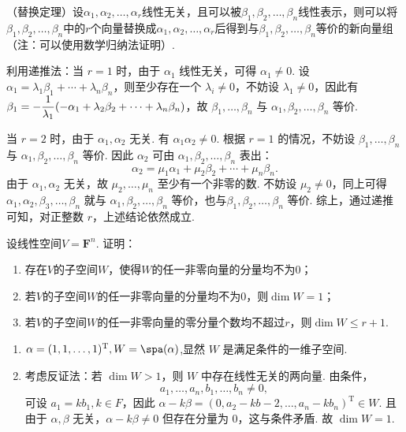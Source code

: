 \begin{exercise}
\begin{exgroup}
        \item （替换定理）设$\alpha_1,\alpha_2,\ldots,\alpha_r$线性无关，且可以被$\beta_1,\beta_2,\ldots,\beta_n$线性表示，则可以将$\beta_1,\beta_2,\ldots,\beta_n$中的$r$个向量替换成$\alpha_1,\alpha_2,\ldots,\alpha_r$后得到与$\beta_1,\beta_2,\ldots,\beta_n$等价的新向量组（注：可以使用数学归纳法证明）.
        \begin{answer}
            利用递推法：当 $r=1$ 时，由于 $\alpha_1$ 线性无关，可得 $\alpha_1\neq 0$. 设 $\alpha_1=\lambda_1\beta_1+\cdots+\lambda_n\beta_n$，则至少存在一个 $\lambda_i\neq 0$，不妨设 $\lambda_1\neq 0$，因此有 $\beta_1=-\vspace{1ex}\dfrac 1{\lambda_1}(-\alpha_1+\lambda_2\beta_2+\cdots+\lambda_n\beta_n)$，故 $\beta_1,\ldots,\beta_n$ 与 $\alpha_1,\beta_2,\ldots,\beta_n$ 等价.

            当 $r=2$ 时，由于 $\alpha_1,\alpha_2$ 无关. 有 $\alpha_1\alpha_2\neq 0$. 根据 $r=1$ 的情况，不妨设 $\beta_1,\ldots,\beta_n$ 与 $\alpha_1,\beta_2,\ldots,\beta_n$ 等价. 因此 $\alpha_2$ 可由 $\alpha_1,\beta_2,\ldots,\beta_n$ 表出：
            \[\alpha_2=\mu_1\alpha_1+\mu_2\beta_2+\cdots+\mu_n\beta_n.\]
            由于 $\alpha_1,\alpha_2$ 无关，故 $\mu_2,\ldots,\mu_n$ 至少有一个非零的数. 不妨设 $\mu_2\neq 0$，同上可得$\alpha_1,\alpha_2,\beta_3,\ldots,\beta_n$ 就与 $\alpha_1,\beta_2,\ldots,\beta_n$ 等价，也与$\beta_1,\beta_2,\ldots,\beta_n$ 等价. 综上，通过递推可知，对正整数 $r$，上述结论依然成立.
        \end{answer}

        \item 设线性空间$V=\mathbf{F}^n$. 证明：
        \begin{enumerate}
            \item 存在$V$的子空间$W$，使得$W$的任一非零向量的分量均不为0；

            \item 若$V$的子空间$W$的任一非零向量的分量均不为0，则$\dim W=1$；

            \item 若$V$的子空间$W$的任一非零向量的零分量个数均不超过$r$，则$\dim W \leqslant r+1$.
        \end{enumerate}
        \begin{answer}
            \begin{enumerate}
                \item $\alpha=(1,1,\ldots,1)^{\mathrm{T}}, W=\spa(\alpha)$,显然 $W$ 是满足条件的一维子空间.

                \item 考虑反证法：若 $\dim W>1$，则 $W$ 中存在线性无关的两向量. 由条件，
                      \[a_1,\ldots,a_n,b_1,\ldots,b_n\neq 0,\]
                      可设 $a_1=kb_1,k\in F$，因此 $\alpha-k\beta=(0,a_2-kb-2,\ldots,a_n-kb_n)^{\mathrm{T}}\in W$. 且由于 $\alpha,\beta$ 无关，$\alpha-k\beta\neq 0$ 但存在分量为 0，这与条件矛盾. 故 $\dim W=1$.


\end{enumerate}
\end{answer}
\end{exgroup}
\end{exercise}
